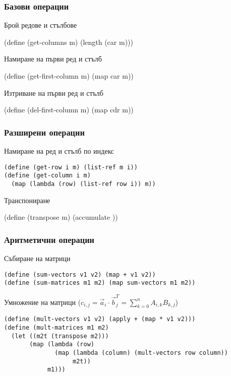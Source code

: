 \documentclass{beamer}
\begin{document}
\begin{frame}[fragile]
  \frametitle{Базови операции}

  Брой редове и стълбове
  \pause
  \onslide<+->
\begin{semiverbatim}
(define (get-columns m) (length (car m)))
\end{semiverbatim}
  \onslide<+->
  Намиране на първи ред и стълб
  \onslide<+->
\begin{semiverbatim}
(define (get-first-column m) (map car m))
\end{semiverbatim}
  \onslide<+->
  Изтриване на първи ред и стълб
  \onslide<+->
\begin{semiverbatim}
(define (del-first-column m) (map cdr m))
\end{semiverbatim}
\end{frame}


\begin{frame}[fragile]
  \frametitle{Разширени операции}

  Намиране на ред и стълб по индекс
  \pause
\begin{verbatim}
(define (get-row i m) (list-ref m i))
(define (get-column i m)
  (map (lambda (row) (list-ref row i)) m))
\end{verbatim}
  \pause
  Транспониране
  \pause
  \onslide<+->
  \begin{overprint}
\begin{semiverbatim}
(define (transpose m)
  (accumulate    
               ))
\end{semiverbatim}
  \end{overprint}
\end{frame}

\begin{frame}[fragile]
  \frametitle{Аритметични операции}

  Събиране на матрици
  \pause
\begin{verbatim}
(define (sum-vectors v1 v2) (map + v1 v2))
(define (sum-matrices m1 m2) (map sum-vectors m1 m2))
\end{verbatim}
  \pause
  \vspace{1em}
  Умножение на матрици ($c_{i,j} = \vec a_i\cdot \vec b^T_j = \sum_{k=0}^n A_{i,k}B_{k,j}$)
  \pause
\begin{verbatim}
(define (mult-vectors v1 v2) (apply + (map * v1 v2)))
(define (mult-matrices m1 m2)
  (let ((m2t (transpose m2)))
       (map (lambda (row)
              (map (lambda (column) (mult-vectors row column))
                   m2t))
            m1)))
\end{verbatim}
\end{frame}
\end{document}
